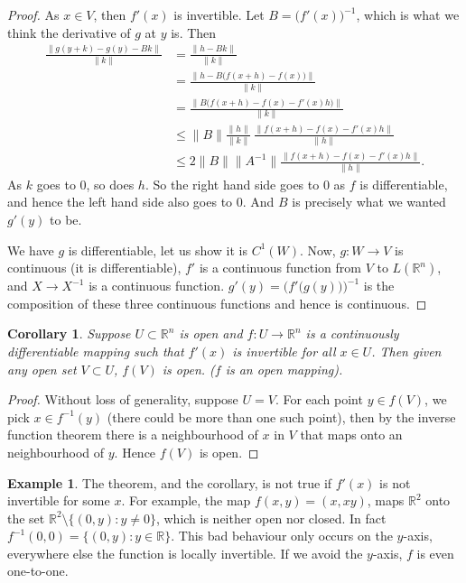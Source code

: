 \documentclass[12pt]{book}
\newcommand{\snorm}[1]{\lVert {#1} \rVert}
\newcommand{\R}{{\mathbb{R}}}
\theoremstyle{plain}
\newtheorem{cor}[thm]{Corollary}
\theoremstyle{remark}
\theoremstyle{definition}
\theoremstyle{exercise}
\theoremstyle{example}
\newtheorem{example}[thm]{Example}
\begin{document}
\begin{proof}
As $x \in V$, then $f'(x)$ is invertible.
Let $B = \bigl(f'(x)\bigr)^{-1}$, which is what we think the derivative of
$g$ at $y$ is.  Then
\begin{equation*}
\begin{split}
\frac{\snorm{g(y+k)-g(y)-Bk}}{\snorm{k}}
& =
\frac{\snorm{h-Bk}}{\snorm{k}}
\\
& =
\frac{\snorm{h-B\bigl(f(x+h)-f(x)\bigr)}}{\snorm{k}}
\\
& =
\frac{\snorm{B\bigl(f(x+h)-f(x)-f'(x)h\bigr)}}{\snorm{k}}
\\
& \leq
\snorm{B}
\frac{\snorm{h}}{\snorm{k}}\,
\frac{\snorm{f(x+h)-f(x)-f'(x)h}}{\snorm{h}}
\\
& \leq
2\snorm{B}\snorm{A^{-1}}
\frac{\snorm{f(x+h)-f(x)-f'(x)h}}{\snorm{h}} .
\end{split}
\end{equation*}
As $k$ goes to 0, so does $h$.  So the right hand side goes to 0 as $f$ is
differentiable, and hence
the left hand side also goes to 0.  And
$B$ is precisely what we wanted $g'(y)$ to be.

We have $g$ is differentiable, let us show it is $C^1(W)$.
Now, $g \colon W \to V$ is continuous (it is differentiable),
$f'$ is a continuous function from $V$
to $L(\R^n)$, and $X \to X^{-1}$ is a continuous function.  
$g'(y) = {\bigl( f'\bigl(g(y)\bigr)\bigr)}^{-1}$ is the composition
of these three
continuous functions and hence is continuous.
\end{proof}

\begin{cor}
Suppose $U \subset \R^n$ is open and $f \colon U \to \R^n$ is a continuously
differentiable mapping such that $f'(x)$ is invertible for all $x \in U$.  Then
given any open set $V \subset U$, $f(V)$ is open.  ($f$ is an open mapping).
\end{cor}

\begin{proof}
Without loss of generality, suppose $U=V$.
For each point $y \in f(V)$, we pick $x \in f^{-1}(y)$ (there could be more
than one such point), then by the inverse function theorem there is a
neighbourhood of $x$ in $V$ that maps onto an neighbourhood of $y$.  Hence
$f(V)$ is open.
\end{proof}

\begin{example}
The theorem, and the corollary, is not true if $f'(x)$ is not invertible for
some $x$.  For example,
the map $f(x,y) = (x,xy)$, maps $\R^2$ onto the set
$\R^2 \setminus \{ (0,y) : y \neq 0 \}$, which is neither open nor closed.
In fact $f^{-1}(0,0) = \{ (0,y) : y \in \R \}$.  This bad behaviour
only occurs on the $y$-axis, everywhere else the function is locally
invertible.  If we avoid the $y$-axis, $f$ is even one-to-one.
\end{example}
\end{document}
